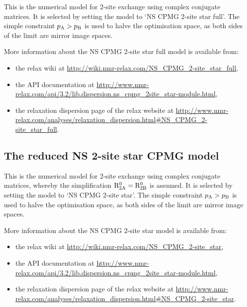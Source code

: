 This is the numerical model for 2-site exchange using complex conjugate matrices.
It is selected by setting the model to `NS CPMG 2-site star full'.
The simple constraint $p_{\textrm{A}} > p_{\textrm{B}}$ is used to halve the optimisation space, as both sides of the limit are mirror image spaces.

More information about the NS CPMG 2-site star full model is available from:
\begin{itemize}
  \item the relax wiki at \url{http://wiki.nmr-relax.com/NS\_CPMG\_2-site\_star\_full},
  \item the API documentation at \url{http://www.nmr-relax.com/api/3.2/lib.dispersion.ns\_cpmg\_2site\_star-module.html},
  \item the relaxation dispersion page of the relax website at \url{http://www.nmr-relax.com/analyses/relaxation\_dispersion.html#NS\_CPMG\_2-site\_star\_full}.
\end{itemize}



\subsection{The reduced NS 2-site star CPMG model}
\label{sect: dispersion: NS CPMG 2-site star model}

This is the numerical model for 2-site exchange using complex conjugate matrices, whereby the simplification $\mathrm{R}_{\mathrm{2A}}^0 = \mathrm{R}_{\mathrm{2B}}^0$ is assumed.
It is selected by setting the model to `NS CPMG 2-site star'.
The simple constraint $p_{\textrm{A}} > p_{\textrm{B}}$ is used to halve the optimisation space, as both sides of the limit are mirror image spaces.

More information about the NS CPMG 2-site star model is available from:
\begin{itemize}
  \item the relax wiki at \url{http://wiki.nmr-relax.com/NS\_CPMG\_2-site\_star},
  \item the API documentation at \url{http://www.nmr-relax.com/api/3.2/lib.dispersion.ns\_cpmg\_2site\_star-module.html},
  \item the relaxation dispersion page of the relax website at \url{http://www.nmr-relax.com/analyses/relaxation\_dispersion.html#NS\_CPMG\_2-site\_star}.
\end{itemize}



